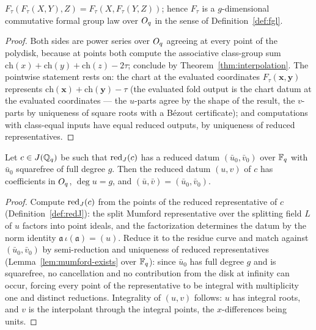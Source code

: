 \begin{theorem}[Associativity]
\label{thm:Ftau-assoc}
\leanok
{}
$F_\tau(F_\tau(X,Y),Z) = F_\tau(X,F_\tau(Y,Z))$; hence $F_\tau$ is a $g$-dimensional
commutative formal group law over $O_q$ in the sense of Definition~\ref{def:fgl}.
\end{theorem}
\begin{proof}
\leanok
Both sides are power series over $O_q$ agreeing at every point of the polydisk, because
at points both compute the associative class-group sum
$\mathrm{ch}(x)+\mathrm{ch}(y)+\mathrm{ch}(z)-2\tau$; conclude by
Theorem~\ref{thm:interpolation}. The pointwise statement rests on: the chart at the
evaluated coordinates $F_\tau(\mathbf x, \mathbf y)$ represents
$\mathrm{ch}(\mathbf x) + \mathrm{ch}(\mathbf y) - \tau$ (the evaluated fold output is
the chart datum at the evaluated coordinates --- the $u$-parts agree by the shape of
the result, the $v$-parts by uniqueness of square roots with a B\'ezout certificate);
and computations with class-equal inputs have equal reduced outputs, by uniqueness of
reduced representatives.
\end{proof}

\begin{lemma}
\label{lem:reduce-commutes}
\leanok
{}
Let $c \in J(\mathbb{Q}_q)$ be such that $\operatorname{red}_J(c)$ has a reduced datum
$(\bar u_0, \bar v_0)$ over $\mathbb{F}_q$ with $\bar u_0$ squarefree of full degree $g$. Then
the reduced datum $(u, v)$ of $c$ has coefficients in $O_q$, $\deg u = g$, and
$(\bar u, \bar v) = (\bar u_0, \bar v_0)$.
\end{lemma}
\begin{proof}
\leanok
Compute $\operatorname{red}_J(c)$ from the points of the reduced representative of $c$
(Definition~\ref{def:redJ}): the split Mumford representative over the splitting field
$L$ of $u$ factors into point ideals, and the factorization determines the datum by the
norm identity $\mathfrak a\,\iota(\mathfrak a) = (u)$. Reduce it to the residue curve
and match against $(\bar u_0, \bar v_0)$ by semi-reduction and uniqueness of reduced
representatives (Lemma~\ref{lem:mumford-exists} over $\mathbb{F}_q$): since $\bar u_0$ has full
degree $g$ and is squarefree, no cancellation and no contribution from the disk at
infinity can occur, forcing every point of the representative to be integral with
multiplicity one and distinct reductions. Integrality of $(u, v)$ follows: $u$ has
integral roots, and $v$ is the interpolant through the integral points, the
$x$-differences being units.
\end{proof}

